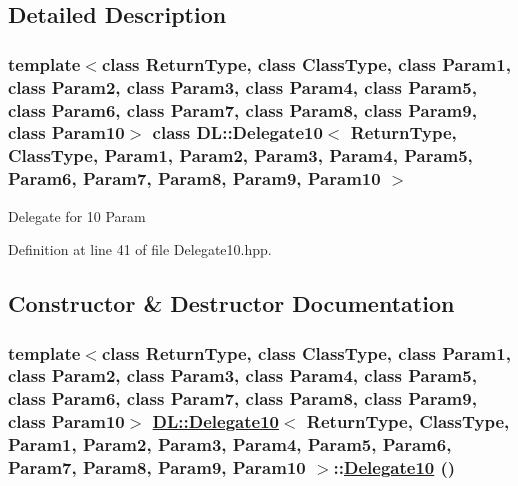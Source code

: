 \subsection{Detailed Description}
\subsubsection*{template$<$class Return\-Type, class Class\-Type, class Param1, class Param2, class Param3, class Param4, class Param5, class Param6, class Param7, class Param8, class Param9, class Param10$>$ class DL::Delegate10$<$ Return\-Type, Class\-Type, Param1, Param2, Param3, Param4, Param5, Param6, Param7, Param8, Param9, Param10 $>$}

Delegate for 10 Param



Definition at line 41 of file Delegate10.hpp.

\subsection{Constructor \& Destructor Documentation}
\hypertarget{classDL_1_1Delegate10_d0}{
\subsubsection[Delegate10]{\setlength{\rightskip}{0pt plus 5cm}template$<$class Return\-Type, class Class\-Type, class Param1, class Param2, class Param3, class Param4, class Param5, class Param6, class Param7, class Param8, class Param9, class Param10$>$ \hyperlink{classDL_1_1Delegate10}{DL::Delegate10}$<$ Return\-Type, Class\-Type, Param1, Param2, Param3, Param4, Param5, Param6, Param7, Param8, Param9, Param10 $>$::\hyperlink{classDL_1_1Delegate10}{Delegate10} ()}}
\label{classDL_1_1Delegate10_d0}




